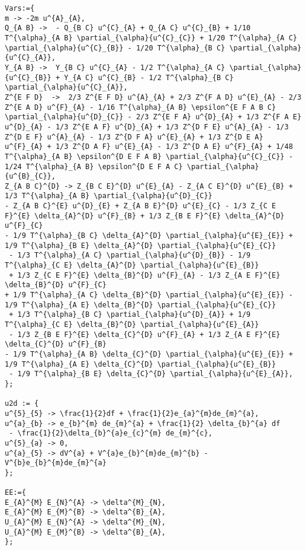 \documentclass[11pt]{article}
\begin{document}
{\color[named]{Blue}\begin{verbatim}
Vars:={
m -> -2m u^{A}_{A},
Q_{A B} ->  - Q_{B C} u^{C}_{A} + Q_{A C} u^{C}_{B} + 1/10 T^{\alpha}_{A B} \partial_{\alpha}{u^{C}_{C}} + 1/20 T^{\alpha}_{A C} \partial_{\alpha}{u^{C}_{B}} - 1/20 T^{\alpha}_{B C} \partial_{\alpha}{u^{C}_{A}},
Y_{A B} ->  Y_{B C} u^{C}_{A} - 1/2 T^{\alpha}_{A C} \partial_{\alpha}{u^{C}_{B}} + Y_{A C} u^{C}_{B} - 1/2 T^{\alpha}_{B C} \partial_{\alpha}{u^{C}_{A}},
Z^{E F D}  ->  2/3 Z^{E F D} u^{A}_{A} + 2/3 Z^{F A D} u^{E}_{A} - 2/3 Z^{E A D} u^{F}_{A} - 1/16 T^{\alpha}_{A B} \epsilon^{E F A B C} \partial_{\alpha}{u^{D}_{C}} - 2/3 Z^{E F A} u^{D}_{A} + 1/3 Z^{F A E} u^{D}_{A} - 1/3 Z^{E A F} u^{D}_{A} + 1/3 Z^{D F E} u^{A}_{A} - 1/3 Z^{D E F} u^{A}_{A} - 1/3 Z^{D F A} u^{E}_{A} + 1/3 Z^{D E A} u^{F}_{A} + 1/3 Z^{D A F} u^{E}_{A} - 1/3 Z^{D A E} u^{F}_{A} + 1/48 T^{\alpha}_{A B} \epsilon^{D E F A B} \partial_{\alpha}{u^{C}_{C}} - 1/24 T^{\alpha}_{A B} \epsilon^{D E F A C} \partial_{\alpha}{u^{B}_{C}},
Z_{A B C}^{D} -> Z_{B C E}^{D} u^{E}_{A} - Z_{A C E}^{D} u^{E}_{B} + 1/3 T^{\alpha}_{A B} \partial_{\alpha}{u^{D}_{C}} 
- Z_{A B C}^{E} u^{D}_{E} + Z_{A B E}^{D} u^{E}_{C} - 1/3 Z_{C E F}^{E} \delta_{A}^{D} u^{F}_{B} + 1/3 Z_{B E F}^{E} \delta_{A}^{D} u^{F}_{C} 
- 1/9 T^{\alpha}_{B C} \delta_{A}^{D} \partial_{\alpha}{u^{E}_{E}} + 1/9 T^{\alpha}_{B E} \delta_{A}^{D} \partial_{\alpha}{u^{E}_{C}}
 - 1/3 T^{\alpha}_{A C} \partial_{\alpha}{u^{D}_{B}} - 1/9 T^{\alpha}_{C E} \delta_{A}^{D} \partial_{\alpha}{u^{E}_{B}}
 + 1/3 Z_{C E F}^{E} \delta_{B}^{D} u^{F}_{A} - 1/3 Z_{A E F}^{E} \delta_{B}^{D} u^{F}_{C} 
+ 1/9 T^{\alpha}_{A C} \delta_{B}^{D} \partial_{\alpha}{u^{E}_{E}} - 1/9 T^{\alpha}_{A E} \delta_{B}^{D} \partial_{\alpha}{u^{E}_{C}}
 + 1/3 T^{\alpha}_{B C} \partial_{\alpha}{u^{D}_{A}} + 1/9 T^{\alpha}_{C E} \delta_{B}^{D} \partial_{\alpha}{u^{E}_{A}}
 - 1/3 Z_{B E F}^{E} \delta_{C}^{D} u^{F}_{A} + 1/3 Z_{A E F}^{E} \delta_{C}^{D} u^{F}_{B} 
- 1/9 T^{\alpha}_{A B} \delta_{C}^{D} \partial_{\alpha}{u^{E}_{E}} + 1/9 T^{\alpha}_{A E} \delta_{C}^{D} \partial_{\alpha}{u^{E}_{B}}
 - 1/9 T^{\alpha}_{B E} \delta_{C}^{D} \partial_{\alpha}{u^{E}_{A}},
};

u2d := {
u^{5}_{5} -> \frac{1}{2}df + \frac{1}{2}e_{a}^{m}de_{m}^{a},
u^{a}_{b} -> e_{b}^{m} de_{m}^{a} + \frac{1}{2} \delta_{b}^{a} df
 - \frac{1}{2}\delta_{b}^{a}e_{c}^{m} de_{m}^{c},
u^{5}_{a} -> 0,
u^{a}_{5} -> dV^{a} + V^{a}e_{b}^{m}de_{m}^{b} - V^{b}e_{b}^{m}de_{m}^{a}
};

EE:={
E_{A}^{M} E_{N}^{A} -> \delta^{M}_{N},
E_{A}^{M} E_{M}^{B} -> \delta^{B}_{A},
U_{A}^{M} E_{N}^{A} -> \delta^{M}_{N},
U_{A}^{M} E_{M}^{B} -> \delta^{B}_{A},
};



\end{verbatim}}
\end{document}
